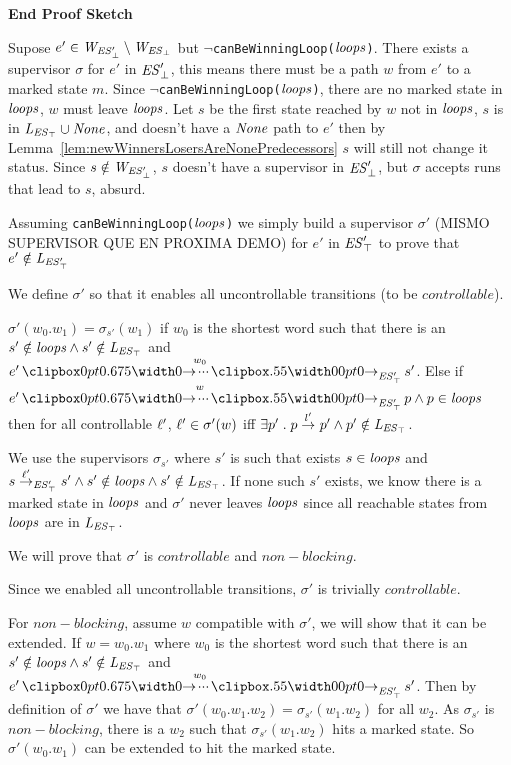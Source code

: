 \textbf{{End Proof Sketch}}

Supose $e' \in \mathit{W_{\mathit{\mathit{ES}'_{\bot}}}} \setminus \mathit{W_{\mathit{\mathit{ES}_{\bot}}}}$ but $\neg$\texttt{canBeWinningLoop($\mathit{loops}$)}.
There exists a supervisor $\sigma$ for $e'$ in $\mathit{\mathit{ES}'_{\bot}}$, this means there must be a path $w$ from $e'$ to a marked state $m$. 
Since $\neg$\texttt{canBeWinningLoop($\mathit{loops}$)}, there are no marked state in $\mathit{loops}$, $w$ must leave $\mathit{loops}$. 
Let $s$ be the first state reached by $w$ not in $\mathit{loops}$, $s$ is in $\mathit{L_{\mathit{\mathit{ES}_{\top}}}} \cup \mathit{None}$, and doesn't have a $\mathit{None}$ path to $e'$ then by Lemma~\ref{lem:newWinnersLosersAreNonePredecessors} $s$ will still not change it status.
Since $s \notin \mathit{W_{\mathit{\mathit{ES}'_{\bot}}}}$, $s$ doesn't have a supervisor in $\mathit{\mathit{ES}'_{\bot}}$, but $\sigma$ accepts runs that lead to $s$, absurd.



Assuming \texttt{canBeWinningLoop($\mathit{loops}$)} we simply build a supervisor $\sigma'$ (MISMO SUPERVISOR QUE EN PROXIMA DEMO) for $e'$ in $\mathit{\mathit{ES}'_{\top}}$ to prove that $e' \notin \mathit{L_{\mathit{\mathit{ES}'_{\top}}}}$


We define $\sigma'$ so that it enables all uncontrollable transitions (to be $controllable$).

$\sigma'(w_0.w_1) = \sigma_{s'}(w_1)$ if $w_0$ is the shortest word such that there is an $s' \notin \mathit{loops} \wedge s'\notin \mathit{L_{\mathit{\mathit{ES}_{\top}}}}$ and $e' \runw{w_0}{\unexploredToTop{\structure'}} s'$.
Else if $e' \runw{w}{\unexploredToTop{\structure'}} p \wedge p \in \SCC$ then for all controllable $\ell'$, $\ell' \in\sigma'(w)$ iff $\exists  p' \;.\; p \overset{l'}{\rightarrow}_{} p' \wedge p' \notin \mathit{L_{\mathit{\mathit{ES}_{\top}}}}$.

We use the supervisors $\sigma_{s'}$ where $s'$ is such that exists $s \in \mathit{loops}$ and $s\overset{\ell'}{\rightarrow}_{\mathit{\mathit{ES}'_{\top}}} s'\wedge s' \notin \mathit{loops} \wedge s'\notin \mathit{L_{\mathit{\mathit{ES}_{\top}}}}$. If none such $s'$ exists, we know there is a marked state in $\mathit{loops}$ and $\sigma'$ never leaves $\mathit{loops}$ since all reachable states from $\mathit{loops}$ are in $\mathit{L_{\mathit{\mathit{ES}_{\top}}}}$.



We will prove that $\sigma'$ is $controllable$ and $non-blocking$.

Since we enabled all uncontrollable transitions, $\sigma'$ is trivially $controllable$.

For $non-blocking$, assume $w$ compatible with $\sigma'$, we will show that it can be extended. If $w = w_0.w_1$ where $w_0$ is the shortest word such that there is an $s' \notin \mathit{loops} \wedge s' \notin \mathit{L_{\mathit{\mathit{ES}_{\top}}}}$ and $e' \runw{w_0}{\unexploredToTop{\structure'}} s'$. Then by definition of $\sigma'$ we have that $\sigma'(w_0.w_1.w_2) = \sigma_{s'}(w_1.w_2)$ for all $w_2$. As $\sigma_{s'}$ is $non-blocking$, there is a $w_2$ such that $\sigma_{s'}(w_1.w_2)$ hits a marked state. So $\sigma'(w_0.w_1)$ can be extended to hit the marked state. 

